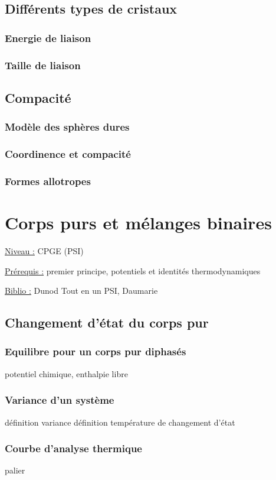 \documentclass{article}%
\begin{document}
\subsection{Différents types de cristaux}
\subsubsection{Energie de liaison}
\subsubsection{Taille de liaison}

\subsection{Compacité}
\subsubsection{Modèle des sphères dures}
\subsubsection{Coordinence et compacité}
\subsubsection{Formes allotropes}
\section{Corps purs et mélanges binaires}
\underline{Niveau :} CPGE (PSI)

\underline{Prérequis :} premier principe, potentiels et identités thermodynamiques

\underline{Biblio :} Dunod Tout en un PSI, Daumarie
\subsection{Changement d'état du corps pur}
\subsubsection{Equilibre pour un corps pur diphasés}
potentiel chimique, enthalpie libre
\subsubsection{Variance d'un système}
définition variance
définition température de changement d'état 
\subsubsection{Courbe d'analyse thermique}
palier
\end{document}
